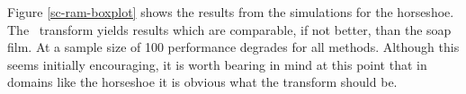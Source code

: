 

Figure \ref{sc-ram-boxplot} shows the results from the simulations for the horseshoe. The \sch\ transform yields results which are comparable, if not better, than the soap film. At a sample size of 100 performance degrades for all methods. Although this seems initially encouraging, it is worth bearing in mind at this point that in domains like the horseshoe it is obvious what the transform should be.

